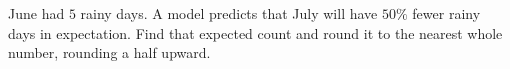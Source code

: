 June had $5$ rainy days. A model predicts that July will have $50\%$ fewer rainy days in expectation. Find that expected count and round it to the nearest whole number, rounding a half upward.
